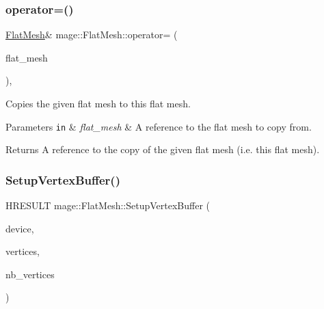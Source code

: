 \hypertarget{classmage_1_1_flat_mesh_a47cf3984f09b850a02e130e6c57260b4}{}\label{classmage_1_1_flat_mesh_a47cf3984f09b850a02e130e6c57260b4} 
\subsubsection{\texorpdfstring{operator=()}{operator=()}}
{\footnotesize\ttfamily \hyperlink{classmage_1_1_flat_mesh}{Flat\+Mesh}\& mage\+::\+Flat\+Mesh\+::operator= (\begin{DoxyParamCaption}\item[{const \hyperlink{classmage_1_1_flat_mesh}{Flat\+Mesh} \&}]{flat\+\_\+mesh }\end{DoxyParamCaption})\hspace{0.3cm}{\ttfamily [private]}, {\ttfamily [delete]}}

Copies the given flat mesh to this flat mesh.


\begin{DoxyParams}[1]{Parameters}
\mbox{\tt in}  & {\em flat\+\_\+mesh} & A reference to the flat mesh to copy from. \\
\hline
\end{DoxyParams}
\begin{DoxyReturn}{Returns}
A reference to the copy of the given flat mesh (i.\+e. this flat mesh). 
\end{DoxyReturn}
\hypertarget{classmage_1_1_flat_mesh_a20f802d719086457fa15e66026d86f06}{}\label{classmage_1_1_flat_mesh_a20f802d719086457fa15e66026d86f06} 
\subsubsection{\texorpdfstring{Setup\+Vertex\+Buffer()}{SetupVertexBuffer()}}
{\footnotesize\ttfamily H\+R\+E\+S\+U\+LT mage\+::\+Flat\+Mesh\+::\+Setup\+Vertex\+Buffer (\begin{DoxyParamCaption}\item[{\hyperlink{namespacemage_ae74f374780900893caa5555d1031fd79}{Com\+Ptr}$<$ I\+D3\+D11\+Device2 $>$}]{device,  }\item[{const \hyperlink{structmage_1_1_vertex}{Vertex} $\ast$}]{vertices,  }\item[{size\+\_\+t}]{nb\+\_\+vertices }\end{DoxyParamCaption})\hspace{0.3cm}{\ttfamily [protected]}}




